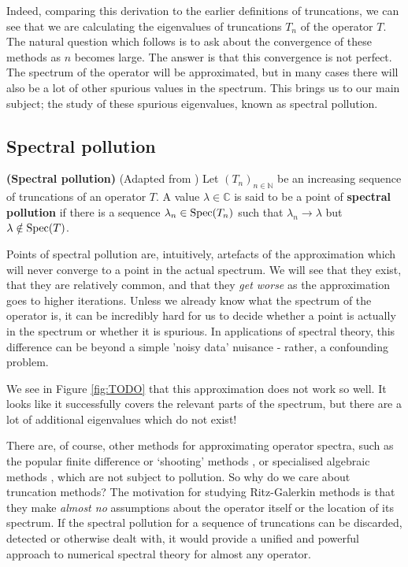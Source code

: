 \documentclass[../main.tex]{subfiles}
\begin{document}
Indeed, comparing this derivation to the earlier definitions of truncations, we can see that we are calculating the eigenvalues of truncations $T_n$ of the
operator $T$. The natural question which follows is to ask about the convergence of these methods as $n$ becomes large. The answer is that this
convergence is not perfect. The spectrum of the operator will be approximated, but in many cases there will also be a lot of other spurious values in the spectrum.
This brings us to our main subject; the study of these spurious eigenvalues, known as spectral pollution.

\subsection{Spectral pollution}

\begin{definition}{\textbf{(Spectral pollution)}}
(Adapted from \parencite{davies1995spectral})
Let $(T_n)_{n \in \mathbb{N}}$ be an increasing sequence of truncations of an operator $T$. A value $\lambda \in \mathbb{C}$ is said to be a point of \textbf{spectral pollution} if there is a sequence $\lambda_n \in \mathrm{Spec}(T_n)$ such that $\lambda_n \rightarrow \lambda$ but $\lambda \notin \mathrm{Spec}(T)$.
\end{definition}

Points of spectral pollution are, intuitively, artefacts of the approximation which will never converge to a point in the actual spectrum. We will see that they exist, that they are relatively common, and that they \emph{get worse} as the approximation goes to higher iterations. Unless we already
know what the spectrum of the operator is, it can be incredibly hard for us to decide whether a point is actually in the spectrum or whether it is
spurious. In applications of spectral theory, this difference can be beyond a simple 'noisy data' nuisance - rather, a confounding problem.

\begin{example}
\end{example}

We see in Figure \ref{fig:TODO} that this approximation does not work so well. It looks like it successfully covers the relevant parts of the spectrum,
but there are a lot of additional eigenvalues which do not exist!

There are, of course, other methods for approximating operator spectra, such as the popular finite difference or `shooting' methods \cite{suli2003introduction}, or specialised algebraic methods \cite{aceto2006numerical}, which are not subject to pollution. So why do we
care about truncation methods?
The motivation for studying Ritz-Galerkin methods is that they make \emph{almost no} assumptions about the operator itself or the location of its spectrum. 
If the spectral pollution for a sequence of truncations can be discarded, detected or otherwise dealt with, it would provide a unified and 
powerful approach to numerical spectral theory for almost any operator.
\end{document}
